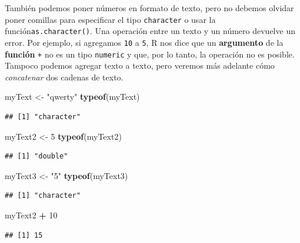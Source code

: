 \documentclass[
]{book}
\newenvironment{Shaded}{\begin{snugshade}}{\end{snugshade}}
\newcommand{\DecValTok}[1]{\textcolor[rgb]{0.00,0.00,0.81}{#1}}
\newcommand{\KeywordTok}[1]{\textcolor[rgb]{0.13,0.29,0.53}{\textbf{#1}}}
\newcommand{\NormalTok}[1]{#1}
\newcommand{\OperatorTok}[1]{\textcolor[rgb]{0.81,0.36,0.00}{\textbf{#1}}}
\newcommand{\StringTok}[1]{\textcolor[rgb]{0.31,0.60,0.02}{#1}}
\begin{document}
También podemos poner números en formato de texto, pero no debemos olvidar poner comillas para especificar el tipo \texttt{character} o usar la función\texttt{as.character()}. Una operación entre un texto y un número devuelve un error. Por ejemplo, si agregamos \texttt{10} a \texttt{5}, R nos dice que un \textbf{argumento} de la \textbf{función} \texttt{+} no es un tipo \texttt{numeric} y que, por lo tanto, la operación no es posible. Tampoco podemos agregar texto a texto, pero veremos más adelante cómo \emph{concatenar} dos cadenas de texto.

\begin{Shaded}
\begin{Highlighting}[]
\NormalTok{myText <-}\StringTok{ "qwerty"}
\KeywordTok{typeof}\NormalTok{(myText)}
\end{Highlighting}
\end{Shaded}

\begin{verbatim}
## [1] "character"
\end{verbatim}

\begin{Shaded}
\begin{Highlighting}[]
\NormalTok{myText2 <-}\StringTok{ }\DecValTok{5}
\KeywordTok{typeof}\NormalTok{(myText2)}
\end{Highlighting}
\end{Shaded}

\begin{verbatim}
## [1] "double"
\end{verbatim}

\begin{Shaded}
\begin{Highlighting}[]
\NormalTok{myText3 <-}\StringTok{ "5"}
\KeywordTok{typeof}\NormalTok{(myText3)}
\end{Highlighting}
\end{Shaded}

\begin{verbatim}
## [1] "character"
\end{verbatim}

\begin{Shaded}
\begin{Highlighting}[]
\NormalTok{myText2 }\OperatorTok{+}\StringTok{ }\DecValTok{10}
\end{Highlighting}
\end{Shaded}

\begin{verbatim}
## [1] 15
\end{verbatim}
\end{document}
